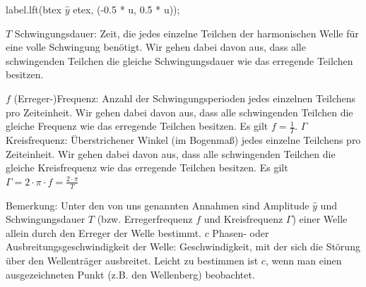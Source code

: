 label.lft(btex $\hat{y}$ etex, (-0.5 * u, 0.5 * u));

\stopMPpage

\stopbuffer

\startframedtext[width=\dimexpr\textwidth+\rightmarginwidth+\rightmargindistance\relax,frame=off,offset=none] %
\stopframedtext


\startframedtext[width=\dimexpr\textwidth+\rightmarginwidth+\rightmargindistance\relax,frame=off,offset=none] %

\startplacetable[title={Größen zum Beschreiben einer Welle, von Leiphi}]
\setupTABLE[r][each][bottomframe=on]
\setupTABLE[r][first][topframe=on]
\setupTABLE[c][first][leftframe=on]
\setupTABLE[c][last][rightframe=on]

\bTABLE[offset=1mm,frame=off]

\bTR \bTD $T$ \eTD 
	\bTD 
	Schwingungsdauer: Zeit, die jedes einzelne Teilchen der harmonischen Welle für
	eine volle Schwingung benötigt. Wir gehen dabei davon aus, dass alle
	schwingenden Teilchen die gleiche Schwingungsdauer wie das erregende Teilchen
	besitzen.
	\eTD 
\eTR

\bTR \bTD $f$ \eTD 
	\bTD 
	(Erreger-)Frequenz: Anzahl der Schwingungsperioden jedes einzelnen Teilchens
	pro Zeiteinheit. Wir gehen dabei davon aus, dass alle schwingenden Teilchen die
	gleiche Frequenz wie das erregende Teilchen besitzen. Es gilt $f=\frac{1}{T}$.
	\eTD
\eTR
\bTR \bTD $\Gamma$ \eTD 
	\bTD 
	Kreisfrequenz: Überstrichener Winkel (im Bogenmaß) jedes einzelne Teilchens pro
	Zeiteinheit. Wir gehen dabei davon aus,  dass alle schwingenden Teilchen die
	gleiche Kreisfrequenz wie das erregende Teilchen besitzen. Es gilt $\Gamma= 2 \cdot \pi \cdot f=\frac{2\cdot \pi}{T}$
	\eTD 
\eTR

\bTR 
	\bTD [nc=2,rightframe=on]
	Bemerkung: Unter den von uns genannten Annahmen sind Amplitude $\hat{y}$ und
	Schwingungsdauer $T$ (bzw. Erregerfrequenz $f$ und Kreisfrequenz $\Gamma$) einer Welle
	allein durch den Erreger der Welle bestimmt.
	\eTD 
\eTR
\bTR \bTD $c$ \eTD 
	\bTD 
	Phasen- oder Ausbreitungsgeschwindigkeit der Welle: Geschwindigkeit,
	mit der sich die Störung über den Wellenträger ausbreitet. Leicht zu bestimmen
	ist $c$, wenn man einen ausgezeichneten Punkt (z.B.
	den Wellenberg) beobachtet.


